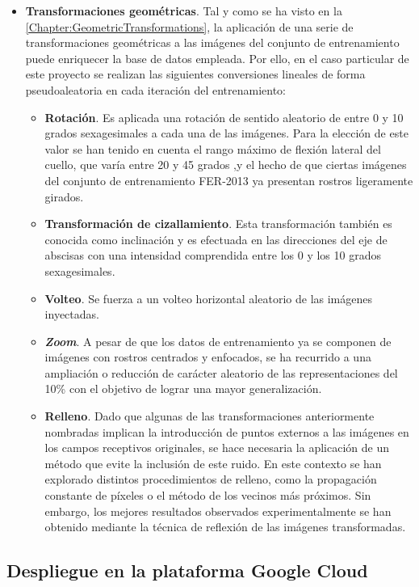 \begin{itemize}
  \item \textbf{Transformaciones geométricas}. Tal y como se ha visto en la \autoref{Chapter:GeometricTransformations}, la aplicación de una serie de transformaciones geométricas a las imágenes del conjunto de entrenamiento puede enriquecer la base de datos empleada. Por ello, en el caso particular de este proyecto se realizan las siguientes conversiones lineales de forma pseudoaleatoria en cada iteración del entrenamiento:
        \begin{itemize}
          \item \textbf{Rotación}. Es aplicada una rotación de sentido aleatorio de entre 0 y 10 grados sexagesimales a cada una de las imágenes. Para la elección de este valor se han tenido en cuenta el rango máximo de flexión lateral del cuello, que varía entre 20 y 45 grados \cite{LateralFlexion},y el hecho de que ciertas imágenes del conjunto de entrenamiento FER-2013 ya presentan rostros ligeramente girados.
          \item \textbf{Transformación de cizallamiento}. Esta transformación también es conocida como inclinación y es efectuada en las direcciones del eje de abscisas con una intensidad comprendida entre los 0 y los 10 grados sexagesimales.
          \item \textbf{Volteo}. Se fuerza a un volteo horizontal aleatorio de las imágenes inyectadas. 
          \item \textbf{\textit{Zoom}}. A pesar de que los datos de entrenamiento ya se componen de imágenes con rostros centrados y enfocados, se ha recurrido a una ampliación o reducción de carácter aleatorio de las representaciones del 10\% con el objetivo de lograr una mayor generalización.
          \item \textbf{Relleno}. Dado que algunas de las transformaciones anteriormente nombradas implican la introducción de puntos externos a las imágenes en los campos receptivos originales, se hace necesaria la aplicación de un método que evite la inclusión de este ruido. En este contexto se han explorado distintos procedimientos de relleno, como la propagación constante de píxeles o el método de los vecinos más próximos. Sin embargo, los mejores resultados observados experimentalmente se han obtenido mediante la técnica de reflexión de las imágenes transformadas.
        \end{itemize}
\end{itemize}

\subsection{Despliegue en la plataforma Google Cloud}





